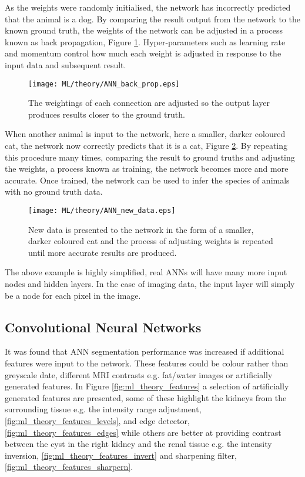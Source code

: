 As the weights were randomly initialised, the network has incorrectly predicted that the animal is a dog. By comparing the result output from the network to the known ground truth, the weights of the network can be adjusted in a process known as back propagation, Figure \ref{fig:ml_theory_adjusted}. Hyper-parameters such as learning rate and momentum control how much each weight is adjusted in response to the input data and subsequent result.

\begin{figure}[H]
	\centering
	\texttt{[image: ML/theory/ANN\_back\_prop.eps]}
	\caption{The weightings of each connection are adjusted so the output layer produces results closer to the ground truth.}
	\label{fig:ml_theory_adjusted}	
\end{figure}

When another animal is input to the network, here a smaller, darker coloured cat, the network now correctly predicts that it is a cat, Figure \ref{fig:ml_theory_new_data}. By repeating this procedure many times, comparing the result to ground truths and adjusting the weights, a process known as training, the network becomes more and more accurate. Once trained, the network can be used to infer the species of animals with no ground truth data.

\begin{figure}[H]
	\centering
	\texttt{[image: ML/theory/ANN\_new\_data.eps]}
	\caption{New data is presented to the network in the form of a smaller, darker coloured cat and the process of adjusting weights is repeated until more accurate results are produced.}
	\label{fig:ml_theory_new_data}	
\end{figure}

The above example is highly simplified, real \ac{ANN}s will have many more input nodes and hidden layers. In the case of imaging data, the input layer will simply be a node for each pixel in the image.

\subsection{Convolutional Neural Networks}

It was found that \ac{ANN} segmentation performance was increased if additional features were input to the network. These features could be colour rather than greyscale date, different \ac{MRI} contrasts e.g. fat/water images or artificially generated features. In Figure \ref{fig:ml_theory_features} a selection of artificially generated features are presented, some of these highlight the kidneys from the surrounding tissue e.g. the intensity range adjustment, \ref{fig:ml_theory_features_levels}, and edge detector, \ref{fig:ml_theory_features_edges} while others are better at providing contrast between the cyst in the right kidney and the renal tissue e.g. the intensity inversion, \ref{fig:ml_theory_features_invert} and sharpening filter, \ref{fig:ml_theory_features_sharpern}.

